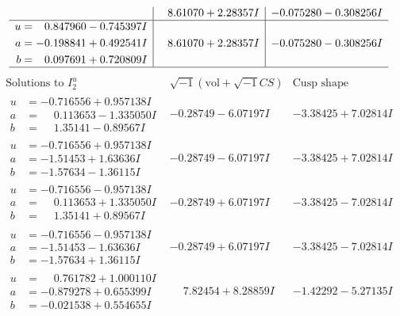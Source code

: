 \documentclass[1p]{elsarticle_modified}
\theoremstyle{definition}
\newcommand{\I}{\sqrt{-1}}
\begin{document}
$$\begin{array}{c|c|c}
 & \phantom{-}8.61070 + 2.28357 I & -0.075280 - 0.308256 I \\ \hline\begin{aligned}
u &= \phantom{-}0.847960 - 0.745397 I \\
a &= -0.198841 + 0.492541 I \\
b &= \phantom{-}0.097691 + 0.720809 I\end{aligned}
 & \phantom{-}8.61070 + 2.28357 I & -0.075280 - 0.308256 I\\
 \hline 
 \end{array}$$\newpage$$\begin{array}{c|c|c}  
\text{Solutions to }I^u_{2}& \I (\text{vol} + \sqrt{-1}CS) & \text{Cusp shape}\\
 \hline 
\begin{aligned}
u &= -0.716556 + 0.957138 I \\
a &= \phantom{-}0.113653 - 1.335050 I \\
b &= \phantom{-}1.35141 - 0.89567 I\end{aligned}
 & -0.28749 - 6.07197 I & -3.38425 + 7.02814 I \\ \hline\begin{aligned}
u &= -0.716556 + 0.957138 I \\
a &= -1.51453 + 1.63636 I \\
b &= -1.57634 - 1.36115 I\end{aligned}
 & -0.28749 - 6.07197 I & -3.38425 + 7.02814 I \\ \hline\begin{aligned}
u &= -0.716556 - 0.957138 I \\
a &= \phantom{-}0.113653 + 1.335050 I \\
b &= \phantom{-}1.35141 + 0.89567 I\end{aligned}
 & -0.28749 + 6.07197 I & -3.38425 - 7.02814 I \\ \hline\begin{aligned}
u &= -0.716556 - 0.957138 I \\
a &= -1.51453 - 1.63636 I \\
b &= -1.57634 + 1.36115 I\end{aligned}
 & -0.28749 + 6.07197 I & -3.38425 - 7.02814 I \\ \hline\begin{aligned}
u &= \phantom{-}0.761782 + 1.000110 I \\
a &= -0.879278 + 0.655399 I \\
b &= -0.021538 + 0.554655 I\end{aligned}
 & \phantom{-}7.82454 + 8.28859 I & -1.42292 - 5.27135 I \\ \hline\begin{aligned}

\end{aligned}
\end{array}$$
\end{document}
